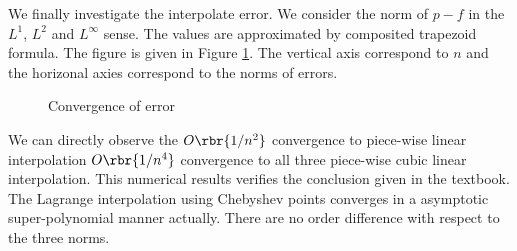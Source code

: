 \documentclass[english, nochinese]{pnote}
\begin{document}
We finally investigate the interpolate error. We consider the norm of $ p - f $ in the $L^1$, $L^2$ and $L^{\infty}$ sense. The values are approximated by composited trapezoid formula. The figure is given in Figure \ref{Fig:Err}. The vertical axis correspond to $n$ and the horizonal axies correspond to the norms of errors.

\begin{figure}
\centering
\scalebox{0.7}{}
\caption{Convergence of error}
\label{Fig:Err}
\end{figure}

We can directly observe the $ O \rbr{ 1 / n^2 } $ convergence to piece-wise linear interpolation $ O \rbr{ 1 / n^4 } $ convergence to all three piece-wise cubic linear interpolation. This numerical results verifies the conclusion given in the textbook. The Lagrange interpolation using Chebyshev points converges in a asymptotic super-polynomial manner actually. There are no order difference with respect to the three norms.
\end{document}
